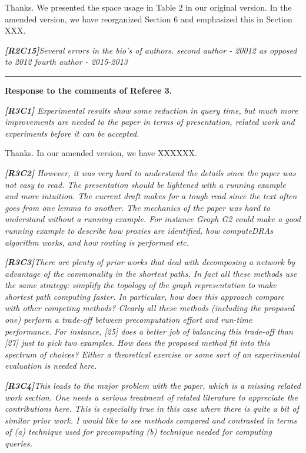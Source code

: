 \documentclass[11pt]{letter}
\newcommand{\vs}{\vspace{1ex}}
\newcommand{\svs}{\vspace{0.36ex}}
\begin{document}
\svs
Thanks. We presented the space usage in Table 2 in our original version. In the amended version, we have reorganized Section 6 and emphasized this in Section XXX.

\vs
\noindent
{\em{\bf[R2C15]}Several errors in the bio's of authors.
second author - 20012 as opposed to 2012
fourth author - 2015-2013}
\svs











\vspace{2.8ex}
\hrule
\vspace{0.6ex}
{\bf Response to the comments of Referee 3.}


\vs
\noindent
{\em{\bf[R3C1]}
Experimental results show some reduction in query time, but much more improvements are needed to the paper in terms of presentation, related work and experiments before it can be accepted.}
\svs

Thanks. In our amended version, we have XXXXXX.



\vs
\noindent
{\em{\bf[R3C2]}  However, it was very hard to understand the details since the paper was not easy to read. The presentation should be lightened with a running example and more intuition.  The current draft makes for a tough read since the text often goes from one lemma to another. The mechanics of the paper was hard to understand without a running example.  For instance Graph G2 could make a good running example to describe how proxies are identified, how computeDRAs algorithm works, and how routing is performed etc.}
\svs

\vs
\noindent
{\em{\bf[R3C3]}There are plenty of prior works that deal with decomposing a network by advantage of the commonality in the shortest paths. In fact all these methods use the same strategy: simplify the topology of the graph representation to make shortest path computing faster. In particular, how does this approach compare with other competing methods? Clearly all these methods (including the proposed one) perform a trade-off between precomputation effort and run-time performance. For instance, [25] does a better job of balancing this trade-off than [27] just to pick two examples. How does the proposed method fit into this spectrum of choices? Either a theoretical exercise or some sort of an experimental evaluation is needed here.}
\svs

\vs
\noindent
{\em{\bf[R3C4]}This leads to the major problem with the paper, which is a missing related work section.  One needs a serious treatment of related literature to appreciate the contributions here. This is especially true in this case where there is quite a bit of similar prior work. I would like to see methods compared and contrasted in terms of (a) technique used for precomputing (b) technique needed for computing queries.}
\svs
\end{document}
